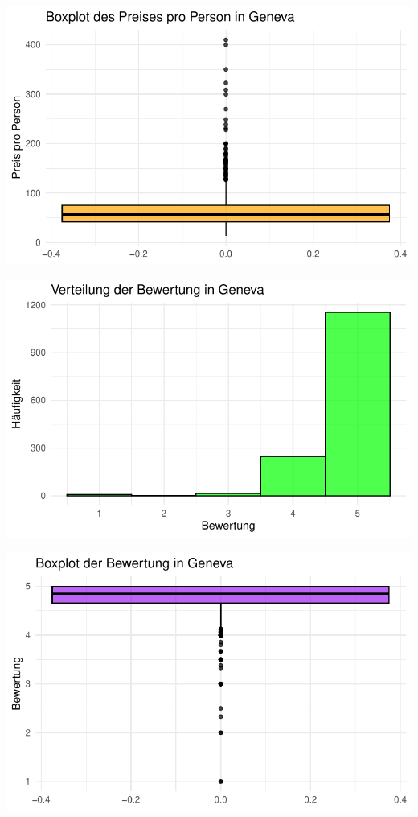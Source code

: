 \documentclass[
  journal,
]{IEEEtran}%
\begin{document}
\includegraphics{main_files/figure-pdf/unnamed-chunk-10-2.pdf}

\includegraphics{main_files/figure-pdf/unnamed-chunk-10-3.pdf}

\includegraphics{main_files/figure-pdf/unnamed-chunk-10-4.pdf}
\end{document}
